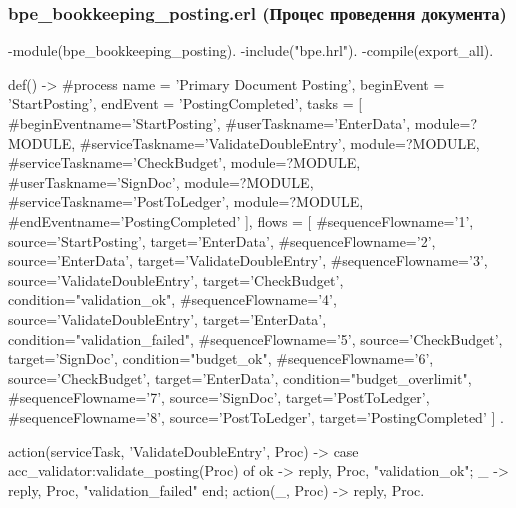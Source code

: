 \documentclass{article}
\let\originalfootnotesize\footnotesize
\let\oldverbatim\verbatim
\let\oldendverbatim\endverbatim
\renewenvironment{verbatim}{\originalfootnotesize\oldverbatim}{\oldendverbatim}
\begin{document}
\subsubsection{bpe\_bookkeeping\_posting.erl (Процес проведення документа)}
\begin{verbatim}
-module(bpe_bookkeeping_posting).
-include("bpe.hrl").
-compile(export_all).

def() ->
    #process{
        name = 'Primary Document Posting',
        beginEvent = 'StartPosting',
        endEvent = 'PostingCompleted',
        tasks = [
            #beginEvent{name='StartPosting'},
            #userTask{name='EnterData', module=?MODULE},
            #serviceTask{name='ValidateDoubleEntry', module=?MODULE},
            #serviceTask{name='CheckBudget', module=?MODULE},
            #userTask{name='SignDoc', module=?MODULE},
            #serviceTask{name='PostToLedger', module=?MODULE},
            #endEvent{name='PostingCompleted'}
        ],
        flows = [
            #sequenceFlow{name='1', source='StartPosting', target='EnterData'},
            #sequenceFlow{name='2', source='EnterData', 
                         target='ValidateDoubleEntry'},
            #sequenceFlow{name='3', source='ValidateDoubleEntry', 
                         target='CheckBudget', condition="validation_ok"},
            #sequenceFlow{name='4', source='ValidateDoubleEntry', 
                         target='EnterData', condition="validation_failed"},
            #sequenceFlow{name='5', source='CheckBudget', 
                         target='SignDoc', condition="budget_ok"},
            #sequenceFlow{name='6', source='CheckBudget', 
                         target='EnterData', condition="budget_overlimit"},
            #sequenceFlow{name='7', source='SignDoc', target='PostToLedger'},
            #sequenceFlow{name='8', source='PostToLedger', 
                         target='PostingCompleted'}
        ]
    }.

action({serviceTask, 'ValidateDoubleEntry'}, Proc) ->
    case acc_validator:validate_posting(Proc) of
        ok -> {reply, Proc, "validation_ok"};
        _  -> {reply, Proc, "validation_failed"}
    end;
action(_, Proc) -> {reply, Proc}.
\end{verbatim}
\end{document}
